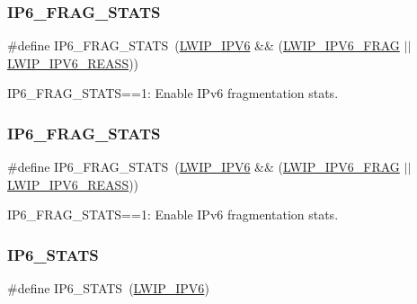 \subsubsection{\texorpdfstring{I\+P6\+\_\+\+F\+R\+A\+G\+\_\+\+S\+T\+A\+TS}{IP6\_FRAG\_STATS}\hspace{0.1cm}{\footnotesize\ttfamily [1/2]}}
{\footnotesize\ttfamily \#define I\+P6\+\_\+\+F\+R\+A\+G\+\_\+\+S\+T\+A\+TS~(\hyperlink{openmote-cc2538_2lwip_2test_2fuzz_2lwipopts_8h_a872e3bb3fe2212156d66b18fccc9643f}{L\+W\+I\+P\+\_\+\+I\+P\+V6} \&\& (\hyperlink{group__lwip__opts__ipv6_ga9ab6269f3087f6d9f7b2c7181ef043c3}{L\+W\+I\+P\+\_\+\+I\+P\+V6\+\_\+\+F\+R\+AG} $\vert$$\vert$ \hyperlink{group__lwip__opts__ipv6_gad0ef160d72e63b02c5e875b06ec53864}{L\+W\+I\+P\+\_\+\+I\+P\+V6\+\_\+\+R\+E\+A\+SS}))}

I\+P6\+\_\+\+F\+R\+A\+G\+\_\+\+S\+T\+A\+TS==1\+: Enable I\+Pv6 fragmentation stats. \mbox{\label{group__lwip__opts__stats_gaaa08a181c11ff8b471549e8f52c9939b}} 
\subsubsection{\texorpdfstring{I\+P6\+\_\+\+F\+R\+A\+G\+\_\+\+S\+T\+A\+TS}{IP6\_FRAG\_STATS}\hspace{0.1cm}{\footnotesize\ttfamily [2/2]}}
{\footnotesize\ttfamily \#define I\+P6\+\_\+\+F\+R\+A\+G\+\_\+\+S\+T\+A\+TS~(\hyperlink{openmote-cc2538_2lwip_2test_2fuzz_2lwipopts_8h_a872e3bb3fe2212156d66b18fccc9643f}{L\+W\+I\+P\+\_\+\+I\+P\+V6} \&\& (\hyperlink{group__lwip__opts__ipv6_ga9ab6269f3087f6d9f7b2c7181ef043c3}{L\+W\+I\+P\+\_\+\+I\+P\+V6\+\_\+\+F\+R\+AG} $\vert$$\vert$ \hyperlink{group__lwip__opts__ipv6_gad0ef160d72e63b02c5e875b06ec53864}{L\+W\+I\+P\+\_\+\+I\+P\+V6\+\_\+\+R\+E\+A\+SS}))}

I\+P6\+\_\+\+F\+R\+A\+G\+\_\+\+S\+T\+A\+TS==1\+: Enable I\+Pv6 fragmentation stats. \mbox{\label{group__lwip__opts__stats_ga6a211b787c97bce3af4273b29c95d9c2}} 
\subsubsection{\texorpdfstring{I\+P6\+\_\+\+S\+T\+A\+TS}{IP6\_STATS}\hspace{0.1cm}{\footnotesize\ttfamily [1/2]}}
{\footnotesize\ttfamily \#define I\+P6\+\_\+\+S\+T\+A\+TS~(\hyperlink{openmote-cc2538_2lwip_2test_2fuzz_2lwipopts_8h_a872e3bb3fe2212156d66b18fccc9643f}{L\+W\+I\+P\+\_\+\+I\+P\+V6})}

